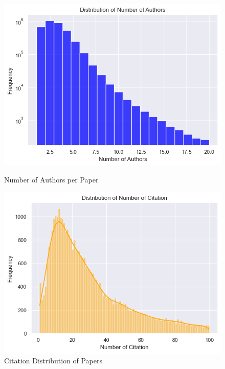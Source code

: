 \documentclass[11pt]{article}
\begin{document}
\begin{figure}[h!]
	\centering
	\begin{minipage}{0.24\textwidth}
		\centering
		\includegraphics[width=\textwidth]{img/preprocess/num_authors.png}
		\caption{Number of Authors per Paper}
		\label{fig:num_authors_per_paper}
	\end{minipage} \hfill
	\begin{minipage}{0.24\textwidth}
		\centering
		\includegraphics[width=\textwidth]{img/preprocess/num_citations.png}
		\caption{Citation Distribution of Papers}
		\label{fig:citation_distribution}
	\end{minipage} \hfill
	\begin{minipage}{0.24\textwidth}
		\centering

\end{minipage}
\end{figure}
\end{document}
